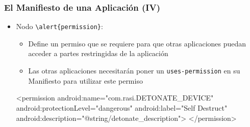 \documentclass[hyperref={pdfpagelabels=true},ucs]{beamer}
\begin{document}
\begin{frame}[fragile]
\frametitle{El Manifiesto de una Aplicación (IV)}  

\begin{itemize}

\item Nodo \Verb|\alert{permission}|:
  \begin{itemize}
  \item Define un permiso que se requiere para que otras aplicaciones
    puedan acceder a partes restringidas de la aplicación
  \item Las otras aplicaciones necesitarán poner un
    \verb|uses-permission| en su Manifiesto para utilizar este permiso
  \end{itemize}

\begin{tiny}
\begin{block}{}
\begin{xml}
<permission android:name="com.rasi.DETONATE_DEVICE"
            android:protectionLevel="dangerous"
            android:label="Self Destruct"
            android:description="@string/detonate_description">
</permission>
\end{xml}
\end{block}
\end{tiny}


\end{itemize}

\end{frame}
\end{document}
